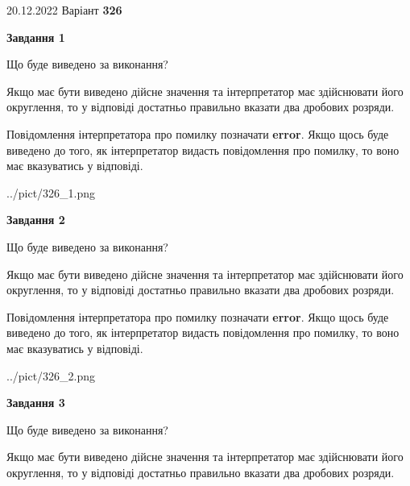 \documentclass[12pt, ukrainian]{article}
\begin{document}
{20.12.2022 Варіант \No \textbf { 326 }\par}
{
\begin {Large}

{\begin {center}\textbf{Завдання 1}\end {center}}\par
Що буде виведено за виконання? \par

Якщо має бути виведено дійсне значення та інтерпретатор має здійснювати його округлення, 
то у відповіді достатньо правильно вказати два дробових розряди.

Повідомлення інтерпретатора про помилку позначати \textbf{error}.
Якщо щось буде виведено до того, як інтерпретатор видасть повідомлення про помилку, 
то воно має вказуватись у відповіді. \par

\begin{center}
	{../pict/326_1.png}
\end{center}
\newpage

{\begin {center}\textbf{Завдання 2}\end {center}}\par
Що буде виведено за виконання? \par

Якщо має бути виведено дійсне значення та інтерпретатор має здійснювати його округлення, 
то у відповіді достатньо правильно вказати два дробових розряди.

Повідомлення інтерпретатора про помилку позначати \textbf{error}.
Якщо щось буде виведено до того, як інтерпретатор видасть повідомлення про помилку, 
то воно має вказуватись у відповіді. \par

\begin{center}
	{../pict/326_2.png}
\end{center}
\newpage

{\begin {center}\textbf{Завдання 3}\end {center}}\par
Що буде виведено за виконання? \par

Якщо має бути виведено дійсне значення та інтерпретатор має здійснювати його округлення, 
то у відповіді достатньо правильно вказати два дробових розряди.


\end{Large}}
\end{document}
